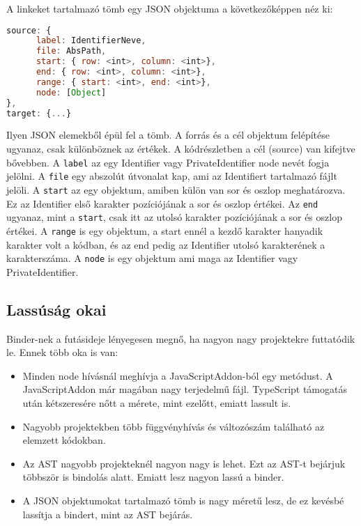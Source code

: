 A linkeket tartalmazó tömb egy JSON objektuma a következőképpen néz ki:

\begin{lstlisting}[caption={Binder JSON objektuma}, label={lst:binder_json_arg}, language={JavaScript}]
source: {
      label: IdentifierNeve,
      file: AbsPath,
      start: { row: <int>, column: <int>},
      end: { row: <int>, column: <int>},
      range: { start: <int>, end: <int>},
      node: [Object]
},
target: {...}
\end{lstlisting}

Ilyen JSON elemekből épül fel a tömb.
A forrás és a cél objektum felépítése ugyanaz, csak különböznek az értékek.
A kódrészletben a cél (source) van kifejtve bővebben.
A \texttt{label} az egy Identifier vagy PrivateIdentifier node nevét fogja jelölni.
A \texttt{file} egy abszolút útvonalat kap, ami az Identifiert tartalmazó fájlt jelöli.
A \texttt{start} az egy objektum, amiben külön van sor és oszlop meghatározva. Ez az Identifier első karakter pozíciójának a sor és oszlop értékei.
Az \texttt{end} ugyanaz, mint a \texttt{start}, csak itt az utolsó karakter pozíciójának a sor és oszlop értékei.
A \texttt{range} is egy objektum, a start ennél a kezdő karakter hanyadik karakter volt a kódban, és az end pedig az Identifier utolsó karakterének a karakterszáma.
A \texttt{node} is egy objektum ami maga az Identifier vagy PrivateIdentifier.

\subsection{Lassúság okai}
Binder-nek a futásideje lényegesen megnő, ha nagyon nagy projektekre futtatódik le.
Ennek több oka is van:

\begin{itemize}
      \item Minden node hívásnál meghívja a JavaScriptAddon-ból egy metódust.
      A JavaScriptAddon már magában nagy terjedelmű fájl. TypeScript támogatás után kétszeresére nőtt a mérete, mint ezelőtt, emiatt lassult is.
      \item Nagyobb projektekben több függvényhívás és változószám található az elemzett kódokban.
      \item Az AST nagyobb projekteknél nagyon nagy is lehet.
      Ezt az AST-t bejárjuk többször is bindolás alatt. Emiatt lesz nagyon lassú a binder.
      \item A JSON objektumokat tartalmazó tömb is nagy méretű lesz, de ez kevésbé lassítja a bindert, mint az AST bejárás.
\end{itemize}

